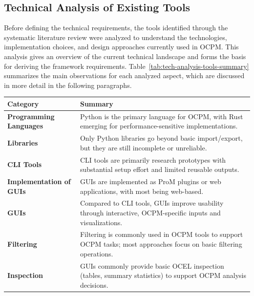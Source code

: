 \subsection{Technical Analysis of Existing Tools}

Before defining the technical requirements, the tools identified through the systematic literature review were analyzed to understand the technologies, implementation choices, and design approaches currently used in OCPM. This analysis gives an overview of the current technical landscape and forms the basis for deriving the framework requirements.
Table~\ref{tab:tech-analysis-tools-summary} summarizes the main observations for each analyzed aspect, which are discussed in more detail in the following paragraphs.

\begin{table}[H]
	\centering
	\small
	\setlength{\tabcolsep}{6pt}
	\renewcommand{\arraystretch}{1.15}
	\begin{tabularx}{\linewidth}{lX}
		\toprule
		\textbf{Category}               & \textbf{Summary}                                                                                                               \\
		\midrule
		\textbf{Programming Languages}  & Python is the primary language for OCPM, with Rust emerging for performance-sensitive implementations.                         \\
		\textbf{Libraries}              & Only Python libraries go beyond basic import/export, but they are still incomplete or unreliable.                              \\
		\textbf{CLI Tools}              & CLI tools are primarily research prototypes with substantial setup effort and limited reusable outputs.                        \\
		\textbf{Implementation of GUIs} & GUIs are implemented as ProM plugins or web applications, with most being web-based.                                           \\
		\textbf{GUIs}                   & Compared to CLI tools, GUIs improve usability through interactive, OCPM-specific inputs and visualizations.                    \\
		\textbf{Filtering}              & Filtering is commonly used in OCPM tools to support OCPM tasks; most approaches focus on basic filtering operations.           \\
		\textbf{Inspection}             & GUIs commonly provide basic OCEL inspection (tables, summary statistics) to support OCPM analysis decisions.                   \\

\end{tabularx}
\end{table}
